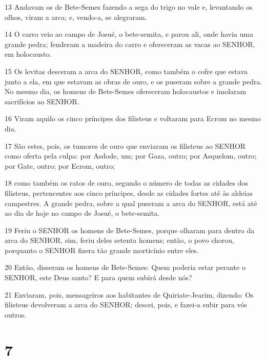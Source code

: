 \par 13 Andavam os de Bete-Semes fazendo a sega do trigo no vale e, levantando os olhos, viram a arca; e, vendo-a, se alegraram.
\par 14 O carro veio ao campo de Josué, o bete-semita, e parou ali, onde havia uma grande pedra; fenderam a madeira do carro e ofereceram as vacas ao SENHOR, em holocausto.
\par 15 Os levitas desceram a arca do SENHOR, como também o cofre que estava junto a ela, em que estavam as obras de ouro, e os puseram sobre a grande pedra. No mesmo dia, os homens de Bete-Semes ofereceram holocaustos e imolaram sacrifícios ao SENHOR.
\par 16 Viram aquilo os cinco príncipes dos filisteus e voltaram para Ecrom no mesmo dia.
\par 17 São estes, pois, os tumores de ouro que enviaram os filisteus ao SENHOR como oferta pela culpa: por Asdode, um; por Gaza, outro; por Asquelom, outro; por Gate, outro; por Ecrom, outro;
\par 18 como também os ratos de ouro, segundo o número de todas as cidades dos filisteus, pertencentes aos cinco príncipes, desde as cidades fortes até às aldeias campestres. A grande pedra, sobre a qual puseram a arca do SENHOR, está até ao dia de hoje no campo de Josué, o bete-semita.
\par 19 Feriu o SENHOR os homens de Bete-Semes, porque olharam para dentro da arca do SENHOR, sim, feriu deles setenta homens; então, o povo chorou, porquanto o SENHOR fizera tão grande morticínio entre eles.
\par 20 Então, disseram os homens de Bete-Semes: Quem poderia estar perante o SENHOR, este Deus santo? E para quem subirá desde nós?
\par 21 Enviaram, pois, mensageiros aos habitantes de Quiriate-Jearim, dizendo: Os filisteus devolveram a arca do SENHOR; descei, pois, e fazei-a subir para vós outros.

\chapter{7}

